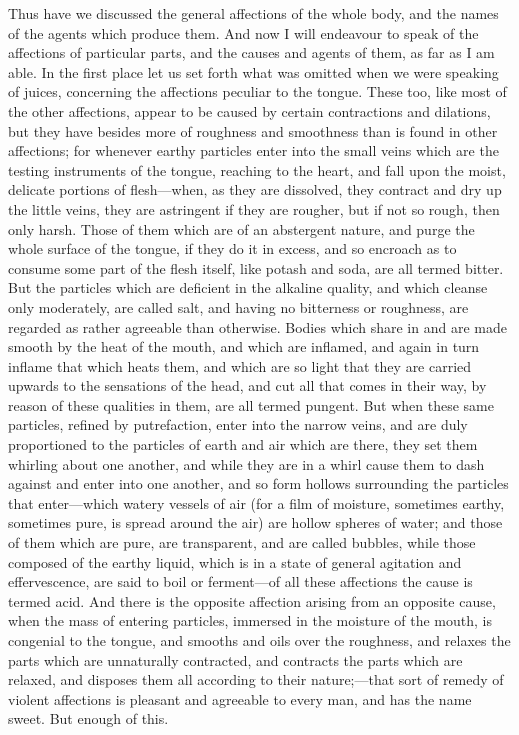 Thus have we discussed the general affections of the whole body, and the
names of the agents which produce them. And now I will endeavour to speak
of the affections of particular parts, and the causes and agents of them,
as far as I am able. In the first place let us set forth what was omitted
when we were speaking of juices, concerning the affections peculiar to the
tongue. These too, like most of the other affections, appear to be caused
by certain contractions and dilations, but they have besides more of
roughness and smoothness than is found in other affections; for whenever
earthy particles enter into the small veins which are the testing
instruments of the tongue, reaching to the heart, and fall upon the moist,
delicate portions of flesh—when, as they are dissolved, they
contract and dry up the little veins, they are astringent if they are
rougher, but if not so rough, then only harsh. Those of them which are of
an abstergent nature, and purge the whole surface of the tongue, if they
do it in excess, and so encroach as to consume some part of the flesh
itself, like potash and soda, are all termed bitter. But the particles
which are deficient in the alkaline quality, and which cleanse only
moderately, are called salt, and having no bitterness or roughness, are
regarded as rather agreeable than otherwise. Bodies which share in and are
made smooth by the heat of the mouth, and which are inflamed, and again in
turn inflame that which heats them, and which are so light that they are
carried upwards to the sensations of the head, and cut all that comes in
their way, by reason of these qualities in them, are all termed pungent.
But when these same particles, refined by putrefaction, enter into the
narrow veins, and are duly proportioned to the particles of earth and air
which are there, they set them whirling about one another, and while they
are in a whirl cause them to dash against and enter into one another, and
so form hollows surrounding the particles that enter—which watery
vessels of air (for a film of moisture, sometimes earthy, sometimes pure,
is spread around the air) are hollow spheres of water; and those of them
which are pure, are transparent, and are called bubbles, while those
composed of the earthy liquid, which is in a state of general agitation
and effervescence, are said to boil or ferment—of all these
affections the cause is termed acid. And there is the opposite affection
arising from an opposite cause, when the mass of entering particles,
immersed in the moisture of the mouth, is congenial to the tongue, and
smooths and oils over the roughness, and relaxes the parts which are
unnaturally contracted, and contracts the parts which are relaxed, and
disposes them all according to their nature;—that sort of remedy of
violent affections is pleasant and agreeable to every man, and has the
name sweet. But enough of this.

